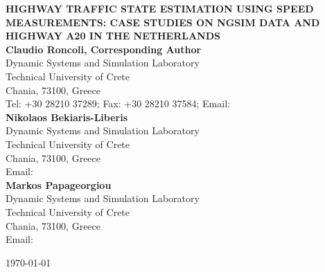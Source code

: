 \documentclass[titlepage,oneside,fleqn,12pt]{article}
\begin{document}
\thispagestyle{empty}

\begin{titlepage}
\begin{flushleft}

{\bfseries HIGHWAY TRAFFIC STATE ESTIMATION USING SPEED MEASUREMENTS: CASE STUDIES ON NGSIM DATA AND HIGHWAY A20 IN THE NETHERLANDS}\\[1.5cm]

\textbf{Claudio Roncoli, Corresponding Author} \\
Dynamic Systems and Simulation Laboratory \\
Technical University of Crete \\
Chania, 73100, Greece \\
Tel: +30 28210 37289; Fax: +30 28210 37584; Email: \href{mailto:croncoli@dssl.tuc.gr}{\textcolor{blue}{\underline{}}}\\[0.5cm]

\textbf{Nikolaos Bekiaris-Liberis} \\
Dynamic Systems and Simulation Laboratory \\
Technical University of Crete \\
Chania, 73100, Greece \\
Email: \href{mailto:nikos.bekiaris@gmail.com}{\textcolor{blue}{\underline{}}}\\[0.5cm]

\textbf{Markos Papageorgiou} \\
Dynamic Systems and Simulation Laboratory \\
Technical University of Crete \\
Chania, 73100, Greece \\
Email: \href{mailto:markos@dssl.tuc.gr}{\textcolor{blue}{\underline{}}}\\[1cm]







\vspace{2.5cm}

\today
\end{flushleft}
\end{titlepage}


\newpage

\setcounter{page}{2}
\end{document}
